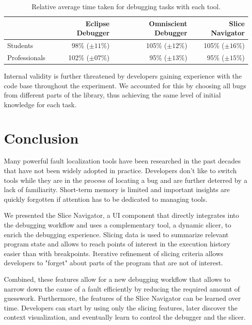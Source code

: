 \documentclass[
			english,
			review,
			]{elsarticle}
\begin{document}
\begin{table}%
	\begin{tabulary}{\textwidth}{LRRR}
		& Eclipse Debugger & Omniscient Debugger & Slice Navigator \\ \midrule
Students & 98\% ($\pm11\%$) & 105\% ($\pm12\%$) & 105\% ($\pm16\%$) \\
Professionals & 102\% ($\pm07\%$) & 95\% ($\pm13\%$) & 95\% ($\pm15\%$) \\
	\end{tabulary}
	\caption{Relative average time taken for debugging tasks with each tool.}
	\label{tab:groupresult}
\end{table}

Internal validity is further threatened by developers gaining experience with the code base throughout the experiment.
We accounted for this by choosing all bugs from different parts of the library, thus achieving the same level of initial knowledge for each task.

\section{Conclusion}
\label{sec:conclusion}

Many powerful fault localization tools have been researched in the past decades that have not been widely adopted in practice.
Developers don't like to switch tools while they are in the process of locating a bug and are further deterred by a lack of familiarity.
Short-term memory is limited and important insights are quickly forgotten if attention has to be dedicated to managing tools.

We presented the Slice Navigator, a UI component that directly integrates into the debugging workflow and uses a complementary tool, a dynamic slicer, to enrich the debugging experience.
Slicing data is used to summarize relevant program state and allows to reach points of interest in the execution history easier than with breakpoints.
Iterative refinement of slicing criteria allows developers to "forget" about parts of the program that are not of interest.

Combined, these features allow for a new debugging workflow that allows to narrow down the cause of a fault efficiently by reducing the required amount of guesswork.
Furthermore, the features of the Slice Navigator can be learned over time.
Developers can start by using only the slicing features, later discover the context visualization, and eventually learn to control the debugger and the slicer.
\end{document}
